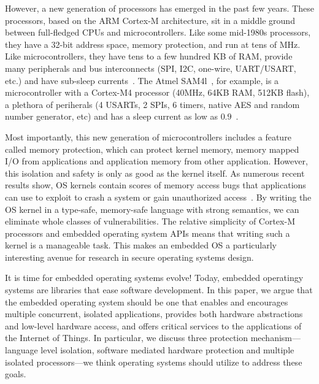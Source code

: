 However, a new generation of processors has emerged in the past few years.
These processors, based on the ARM Cortex-M architecture, sit in a middle ground
between full-fledged CPUs and microcontrollers. Like some mid-1980s processors,
they have a 32-bit address space, memory protection, and run at tens of MHz.
Like microcontrollers, they have tens to a few hundred KB of RAM, provide many
peripherals and bus interconnects (SPI, I2C, one-wire, UART/USART, etc.) and
have sub-\uA sleep currents~. The Atmel SAM4l~\cite{sam4l}, for example, is a
microcontroller with a Cortex-M4 processor (40MHz, 64KB RAM, 512KB flash), a
plethora of periherals (4 USARTs, 2 SPIs, 6 timers, native AES and random number
generator, etc) and has a sleep current as low as $0.9$~\uA.

Most importantly, this new generation of microcontrollers includes a feature
called memory protection, which can protect kernel memory, memory mapped I/O
from applications and application memory from other application. However, this
isolation and safety is only as good as the kernel itself. As numerous recent
results show, OS kernels contain scores of memory access bugs that applications
can use to exploit to crash a system or gain unauthorized
access~\cite{nickolai}. By writing the OS kernel in a type-safe, memory-safe
language with strong semantics, we can eliminate whole classes of
vulnerabilities. The relative simplicity of Cortex-M processors and embedded
operating system APIs means that writing such a kernel is a manageable task.
This makes an embedded OS a particularly interesting avenue for research in
secure operating systems design.

It is time for embedded operating systems evolve! Today, embedded operatingy
systems are libraries that ease software development. In this paper, we argue
that the embedded operating system should be one that enables and encourages
multiple concurrent, isolated applications, provides both hardware abstractions
and low-level hardware access, and offers critical services to the applications
of the Internet of Things. In particular, we discuss three protection
mechanism---language level isolation, software mediated hardware protection and
multiple isolated processors---we think operating systems should utilize to
address these goals.


%
